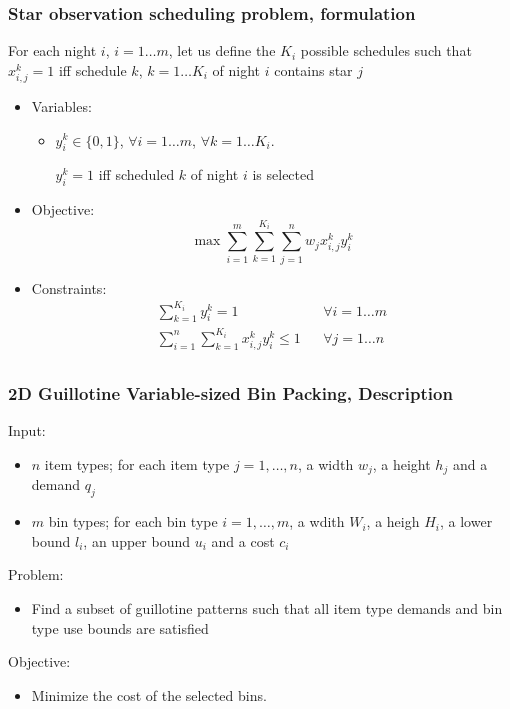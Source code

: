 \documentclass[10pt]{beamer}
\begin{document}
\begin{frame}
  \frametitle{Star observation scheduling problem, formulation}

  For each night $i$, $i = 1 \dots m$, let us define the $K_i$ possible schedules such that $x_{i, j}^k = 1$ iff schedule $k$, $k = 1 \dots K_i$ of night $i$ contains star $j$

  \begin{itemize}
    \item Variables:
      \begin{itemize}
        \item $y_i^k \in \{0, 1\}$,
          $\forall i = 1 \dots m$, $\forall k = 1 \dots K_i$.

          $y_i^k = 1$ iff scheduled $k$ of night $i$ is selected
      \end{itemize}

    \item Objective:
      \begin{displaymath}
        \max \sum_{i = 1}^m \sum_{k = 1}^{K_i} \sum_{j = 1}^n w_j x_{i, j}^k y_i^k
      \end{displaymath}

    \item Constraints:
      \begin{align*}
        \sum_{k = 1}^{K_i} y_i^k = 1 && \forall i = 1 \dots m \\
        \sum_{i = 1}^n \sum_{k = 1}^{K_i} x_{i, j}^k y_i^k \le 1 && \forall j = 1 \dots n \\
      \end{align*}
  \end{itemize}
\end{frame}

\begin{frame}
  \frametitle{2D Guillotine Variable-sized Bin Packing, Description}

  Input:
  \begin{itemize}
    \item $n$ item types; for each item type $j = 1, \dots, n$, a width \alert{$w_j$}, a height \alert{$h_j$} and a demand \alert{$q_j$}
    \item $m$ bin types; for each bin type $i = 1, \dots, m$, a wdith \alert{$W_i$}, a heigh \alert{$H_i$}, a lower bound \alert{$l_i$}, an upper bound \alert{$u_i$} and a cost \alert{$c_i$}
  \end{itemize}

  Problem:
  \begin{itemize}
    \item Find a subset of guillotine patterns such that all item type demands and bin type use bounds are satisfied
  \end{itemize}

  Objective:
  \begin{itemize}
    \item Minimize the cost of the selected bins.
  \end{itemize}
\end{frame}
\end{document}
